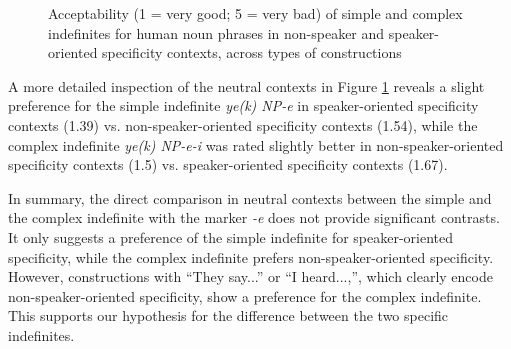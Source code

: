 \documentclass[output=paper]{langsci/langscibook}
\begin{document}
\begin{figure}

\dataset
{}

\caption{Acceptability (1 = very good; 5 = very bad) of simple and complex indefinites for human noun phrases in non-speaker and speaker-oriented specificity contexts, across types of constructions}\label{4fig:3}
\end{figure}

A more detailed inspection of the neutral contexts in Figure \ref{4fig:3} reveals a slight preference for the simple indefinite {\emph{ye(k) NP-e}} in speaker-oriented specificity contexts (1.39) vs. non-speaker-oriented specificity contexts (1.54), while the complex indefinite {\emph{ye(k) NP-e-i}} was rated slightly better in non-speaker-oriented specificity contexts (1.5) vs. speaker-oriented specificity contexts (1.67).

{
In summary, the direct comparison in neutral contexts between the simple and the complex indefinite with the marker {\emph{-e}} does not provide significant contrasts. It only suggests a preference of the simple indefinite for speaker-oriented specificity, while the complex indefinite prefers non-speaker-oriented specificity. However, constructions with ``They say...'' or ``I heard...,'', which clearly encode non-speaker-oriented specificity, show a preference for the complex indefinite. This supports our hypothesis for the difference between the two specific indefinites.
}
\end{document}
